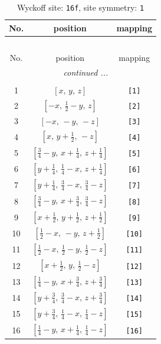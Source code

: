 \documentclass[fleqn,8pt]{jsarticle}
\begin{document}
\begin{longtable}{ccc}
\caption{Wyckoff site: {\tt 16f}, site symmetry: {\tt 1}}
 \\
 \hline \hline
No. & position & mapping \\ \hline \endfirsthead

\multicolumn{2}{l}{\tablename\ \thetable{}} \\
 \hline \hline
No. & position & mapping \\ \hline \endhead

 \hline \hline
\multicolumn{2}{r}{\footnotesize\it continued ...} \\ \endfoot

 \hline \hline
\multicolumn{2}{r}{} \\ \endlastfoot

1 & $\left[ x,\, y,\, z \right]$ & {\tt [1]} \\ \hline
2 & $\left[ - x,\, \frac{1}{2} - y,\, z \right]$ & {\tt [2]} \\ \hline
3 & $\left[ - x,\, - y,\, - z \right]$ & {\tt [3]} \\ \hline
4 & $\left[ x,\, y + \frac{1}{2},\, - z \right]$ & {\tt [4]} \\ \hline
5 & $\left[ \frac{3}{4} - y,\, x + \frac{1}{4},\, z + \frac{1}{4} \right]$ & {\tt [5]} \\ \hline
6 & $\left[ y + \frac{1}{4},\, \frac{1}{4} - x,\, z + \frac{1}{4} \right]$ & {\tt [6]} \\ \hline
7 & $\left[ y + \frac{1}{4},\, \frac{3}{4} - x,\, \frac{3}{4} - z \right]$ & {\tt [7]} \\ \hline
8 & $\left[ \frac{3}{4} - y,\, x + \frac{3}{4},\, \frac{3}{4} - z \right]$ & {\tt [8]} \\ \hline
9 & $\left[ x + \frac{1}{2},\, y + \frac{1}{2},\, z + \frac{1}{2} \right]$ & {\tt [9]} \\ \hline
10 & $\left[ \frac{1}{2} - x,\, - y,\, z + \frac{1}{2} \right]$ & {\tt [10]} \\ \hline
11 & $\left[ \frac{1}{2} - x,\, \frac{1}{2} - y,\, \frac{1}{2} - z \right]$ & {\tt [11]} \\ \hline
12 & $\left[ x + \frac{1}{2},\, y,\, \frac{1}{2} - z \right]$ & {\tt [12]} \\ \hline
13 & $\left[ \frac{1}{4} - y,\, x + \frac{3}{4},\, z + \frac{3}{4} \right]$ & {\tt [13]} \\ \hline
14 & $\left[ y + \frac{3}{4},\, \frac{3}{4} - x,\, z + \frac{3}{4} \right]$ & {\tt [14]} \\ \hline
15 & $\left[ y + \frac{3}{4},\, \frac{1}{4} - x,\, \frac{1}{4} - z \right]$ & {\tt [15]} \\ \hline
16 & $\left[ \frac{1}{4} - y,\, x + \frac{1}{4},\, \frac{1}{4} - z \right]$ & {\tt [16]} \\
\end{longtable}
\end{document}
